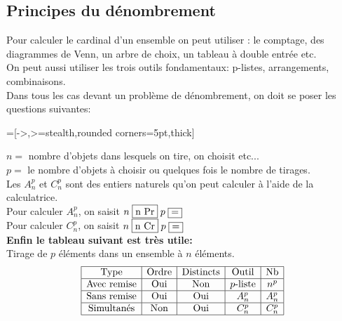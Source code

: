 \subsection{Principes du dénombrement}
Pour calculer le cardinal d'un ensemble on peut utiliser : le comptage, des diagrammes de Venn, un arbre de choix, un tableau à double entrée etc.\\
On peut aussi utiliser les  trois outils fondamentaux:  p-listes,  arrangements,  combinaisons. \\ Dans tous les cas devant un problème de dénombrement, on doit se poser les questions suivantes:
 \begin{center}
=[->,>=stealth,rounded corners=5pt,thick]
\end{center}
 
 $ n= $ nombre d'objets dans lesquels on tire, on choisit etc...\\
  $ p= $  le nombre d'objets à choisir ou quelques fois le nombre de tirages.\\
  
Les $A_{n}^{p} $ et  $C_{n}^{p} $ sont des entiers naturels qu'on peut calculer à l'aide de la calculatrice.\\
 Pour calculer $A_{n}^{p} $, on saisit $ n\; \fbox{n Pr}\; p\;\fbox{=}$\\
 Pour calculer $C_{n}^{p} $, on saisit  $ n\; \fbox{n Cr}\; p\;\fbox{=}$\\

 \textbf{Enfin  le tableau suivant est très utile:}\\
 Tirage de $p$ éléments dans un ensemble à $n$ éléments.
$$
\begin{array}{|c|c|c|c|c|}
\hline
\text{Type} & \text{Ordre} & \text{Distincts} & \text{Outil} & \text{Nb} \\
\hline
\text{Avec remise} & \text{Oui} & \text{Non} & p\text{-liste} & n^p \\
\hline
\text{Sans remise} & \text{Oui} & \text{Oui} & A_n^p & A_n^p \\
\hline
\text{Simultanés} & \text{Non} & \text{Oui} & C_n^p & C_n^p \\
\hline
\end{array}
$$


